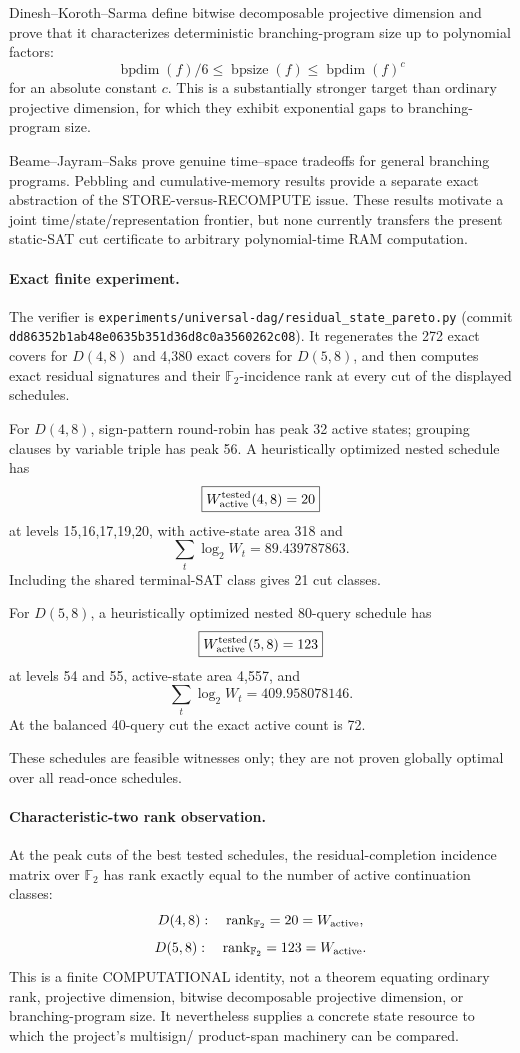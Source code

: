 Dinesh--Koroth--Sarma define bitwise decomposable projective dimension and prove that it
characterizes deterministic branching-program size up to polynomial factors:
\[
\operatorname{bpdim}(f)/6\le \operatorname{bpsize}(f)
\le \operatorname{bpdim}(f)^c
\]
for an absolute constant \(c\). This is a substantially stronger target than ordinary
projective dimension, for which they exhibit exponential gaps to branching-program size.

Beame--Jayram--Saks prove genuine time--space tradeoffs for general branching programs.
Pebbling and cumulative-memory results provide a separate exact abstraction of the
STORE-versus-RECOMPUTE issue. These results motivate a joint time/state/representation
frontier, but none currently transfers the present static-SAT cut certificate to arbitrary
polynomial-time RAM computation.

\paragraph{Exact finite experiment.}
The verifier is
\texttt{experiments/universal-dag/residual\_state\_pareto.py}
(commit \texttt{dd86352b1ab48e0635b351d36d8c0a3560262c08}).
It regenerates the 272 exact covers for \(D(4,8)\) and 4,380 exact covers for
\(D(5,8)\), and then computes exact residual signatures and their
\(\mathbb F_2\)-incidence rank at every cut of the displayed schedules.

For \(D(4,8)\), sign-pattern round-robin has peak 32 active states; grouping clauses by
variable triple has peak 56. A heuristically optimized nested schedule has
\[
\boxed{W_{\rm active}^{\rm tested}(4,8)=20}
\]
at levels 15,16,17,19,20, with active-state area 318 and
\[
\sum_t\log_2 W_t=89.439787863.
\]
Including the shared terminal-SAT class gives 21 cut classes.

For \(D(5,8)\), a heuristically optimized nested 80-query schedule has
\[
\boxed{W_{\rm active}^{\rm tested}(5,8)=123}
\]
at levels 54 and 55, active-state area 4,557, and
\[
\sum_t\log_2 W_t=409.958078146.
\]
At the balanced 40-query cut the exact active count is 72.

These schedules are feasible witnesses only; they are not proven globally optimal over all
read-once schedules.

\paragraph{Characteristic-two rank observation.}
At the peak cuts of the best tested schedules, the residual-completion incidence matrix over
\(\mathbb F_2\) has rank exactly equal to the number of active continuation classes:
\[
D(4,8):\quad \operatorname{rank}_{\mathbb F_2}=20=W_{\rm active},
\]
\[
D(5,8):\quad \operatorname{rank}_{\mathbb F_2}=123=W_{\rm active}.
\]
This is a finite COMPUTATIONAL identity, not a theorem equating ordinary rank,
projective dimension, bitwise decomposable projective dimension, or branching-program size.
It nevertheless supplies a concrete state resource to which the project's multisign/
product-span machinery can be compared.

